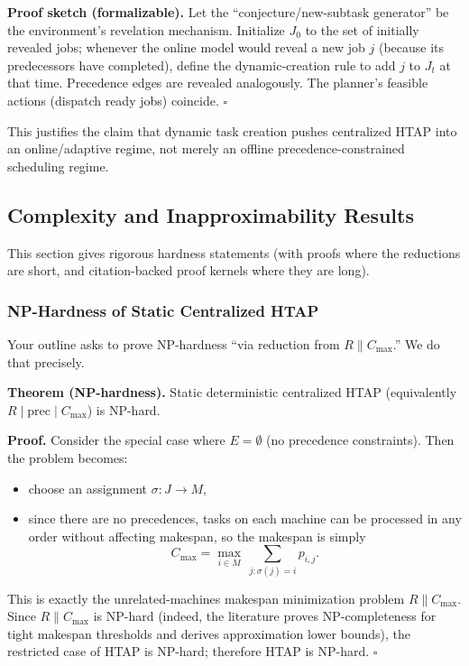 \textbf{Proof sketch (formalizable).} Let the ``conjecture/new-subtask generator'' be the environment's revelation mechanism. Initialize \(J_0\) to the set of initially revealed jobs; whenever the online model would reveal a new job \(j\) (because its predecessors have completed), define the dynamic-creation rule to add \(j\) to \(J_t\) at that time. Precedence edges are revealed analogously. The planner's feasible actions (dispatch ready jobs) coincide. \(\square\)

This justifies the claim that dynamic task creation pushes centralized HTAP into an online/adaptive regime, not merely an offline precedence-constrained scheduling regime.

\subsection{Complexity and Inapproximability Results}

This section gives rigorous hardness statements (with proofs where the reductions are short, and citation-backed proof kernels where they are long).

\subsubsection{NP-Hardness of Static Centralized HTAP}

Your outline asks to prove NP-hardness ``via reduction from \(R\parallel C_{\max}\).'' We do that precisely.

\textbf{Theorem (NP-hardness).} Static deterministic centralized HTAP (equivalently \(R\mid \mathrm{prec}\mid C_{\max}\)) is NP-hard.

\textbf{Proof.} Consider the special case where \(E=\emptyset\) (no precedence constraints). Then the problem becomes:

\begin{itemize}
\item choose an assignment \(\sigma:J\to M\),
\item since there are no precedences, tasks on each machine can be processed in any order without affecting makespan, so the makespan is simply
\[
C_{\max} = \max_{i\in M}\ \sum_{j:\sigma(j)=i} p_{i,j}.
\]
\end{itemize}

This is exactly the unrelated-machines makespan minimization problem \(R\parallel C_{\max}\). Since \(R\parallel C_{\max}\) is NP-hard (indeed, the literature proves NP-completeness for tight makespan thresholds and derives approximation lower bounds), the restricted case of HTAP is NP-hard; therefore HTAP is NP-hard. \(\square\)

